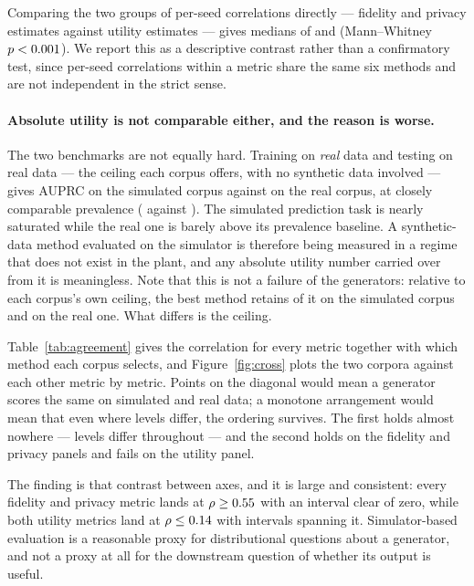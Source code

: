 \documentclass[11pt]{article}
\begin{document}
Comparing the two groups of per-seed correlations directly --- \ciNFidPriv{}
fidelity and privacy estimates against \ciNUtil{} utility estimates --- gives
medians of \ciContrastMedFid{} and \ciContrastMedUtil{}
(Mann--Whitney $p <0.001{}$). We report this as a descriptive contrast
rather than a confirmatory test, since per-seed correlations within a metric
share the same six methods and are not independent in the strict sense.

\paragraph{Absolute utility is not comparable either, and the reason is worse.}
The two benchmarks are not equally hard. Training on \emph{real} data and testing
on real data --- the ceiling each corpus offers, with no synthetic data involved
--- gives AUPRC \trtrAuprcSim{} on the simulated corpus against \trtrAuprcReal{}
on the real corpus, at closely comparable prevalence (\prevSim{} against
\prevReal{}). The simulated prediction task is nearly saturated while the real
one is barely above its prevalence baseline. A synthetic-data method evaluated on
the simulator is therefore being measured in a regime that does not exist in the
plant, and any absolute utility number carried over from it is meaningless. Note
that this is not a failure of the generators: relative to each corpus's own
ceiling, the best method retains \bestUtilRetainSim{} of it on the simulated
corpus and \bestUtilRetainReal{} on the real one. What differs is the ceiling.

Table~\ref{tab:agreement} gives the correlation for every metric together with
which method each corpus selects, and Figure~\ref{fig:cross} plots the two
corpora against each other metric by metric. Points on the diagonal would mean a
generator scores the same on simulated and real data; a monotone arrangement
would mean that even where levels differ, the ordering survives. The first holds
almost nowhere --- levels differ throughout --- and the second holds on the
fidelity and privacy panels and fails on the utility panel.

The finding is that contrast between axes, and it is large and consistent: every
fidelity and privacy metric lands at $\rho \geq 0.55{}$ with an interval
clear of zero, while both utility metrics land at $\rho \leq 0.14{}$ with
intervals spanning it. Simulator-based evaluation is a reasonable proxy for
distributional questions about a generator, and not a proxy at all for the
downstream question of whether its output is useful.
\end{document}
